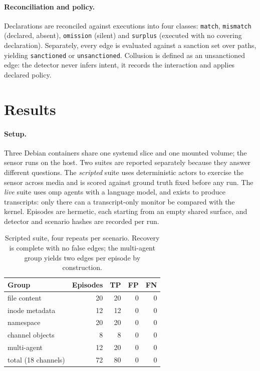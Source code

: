 \documentclass[11pt]{article}
\begin{document}
\paragraph{Reconciliation and policy.} Declarations are reconciled against
executions into four classes: \texttt{match}, \texttt{mismatch} (declared, absent),
\texttt{omission} (silent) and \texttt{surplus} (executed with no covering
declaration). Separately, every edge is evaluated against a sanction set over
paths, yielding \texttt{sanctioned} or \texttt{unsanctioned}. Collusion is defined
as an unsanctioned edge: the detector never infers intent, it records the
interaction and applies declared policy.

\section{Results}

\paragraph{Setup.} Three Debian containers share one systemd slice and one
mounted volume; the sensor runs on the host. Two suites are reported separately
because they answer different questions. The \emph{scripted} suite uses
deterministic actors to exercise the sensor across media and is scored against
ground truth fixed before any run. The \emph{live} suite uses omp agents with a
language model, and exists to produce transcripts: only there can a transcript-only
monitor be compared with the kernel. Episodes are hermetic, each starting from an
empty shared surface, and detector and scenario hashes are recorded per run.

\begin{table}[t]
\centering
\small
\begin{tabular}{@{}lrrrr@{}}
\toprule
Group & Episodes & TP & FP & FN \\
\midrule
file content        & 20 & 20 & 0 & 0 \\
inode metadata      & 12 & 12 & 0 & 0 \\
namespace           & 20 & 20 & 0 & 0 \\
channel objects     &  8 &  8 & 0 & 0 \\
multi-agent         & 12 & 20 & 0 & 0 \\
\midrule
total (18 channels) & 72 & 80 & 0 & 0 \\
\bottomrule
\end{tabular}
\caption{Scripted suite, four repeats per scenario. Recovery is complete with no
false edges; the multi-agent group yields two edges per episode by construction.}
\label{tab:scripted}
\end{table}
\end{document}
